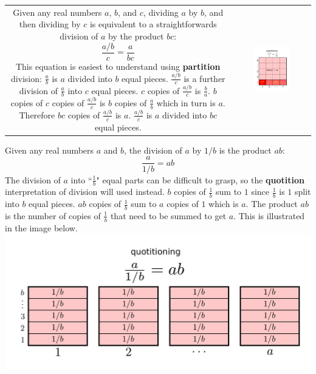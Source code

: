 \documentclass{article}
\begin{document}
\begin{tabular}{cc}
\parbox{0.5\textwidth}{
Given any real numbers \(a\), \(b\), and \(c\), dividing \(a\) by \(b\), and then dividing by \(c\) is equivalent to a straightforwards division of \(a\) by the product \(bc\):
\[\frac{a/b}{c} = \frac{a}{bc}\]
This equation is easiest to understand using {\bf partition} division: \\
\(\frac{a}{b}\) is \(a\) divided into \(b\) equal pieces. \(\frac{a/b}{c}\) is a further division of \(\frac{a}{b}\) into \(c\) equal pieces. \(c\) copies of \(\frac{a/b}{c}\) is \(\frac{b}{a}\). \(b\) copies of \(c\) copies of \(\frac{a/b}{c}\) is \(b\) copies of \(\frac{a}{b}\) which in turn is \(a\). Therefore \(bc\) copies of \(\frac{a/b}{c}\) is \(a\). \(\frac{a/b}{c}\) is \(a\) divided into \(bc\) equal pieces.
} & \parbox{0.5\textwidth}{\includegraphics[width = 0.5\textwidth]{a_div_b_div_c_equals_a_div_bc}}
\end{tabular}

\vspace{5mm}


Given any real numbers \(a\) and \(b\), the division of \(a\) by \(1/b\) is the product \(ab\):
\[\frac{a}{1/b} = ab\]
The division of \(a\) into ``\(\frac{1}{b}\)" equal parts can be difficult to grasp, so the {\bf quotition} interpretation of division will used instead. \(b\) copies of \(\frac{1}{b}\) sum to \(1\) since \(\frac{1}{b}\) is \(1\) split into \(b\) equal pieces. \(ab\) copies of \(\frac{1}{b}\) sum to \(a\) copies of \(1\) which is \(a\). The product \(ab\) is the number of copies of \(\frac{1}{b}\) that need to be summed to get \(a\). This is illustrated in the image below. \\
\includegraphics[width = \textwidth]{a_div_(1_div_b)_equals_ab}
\end{document}
